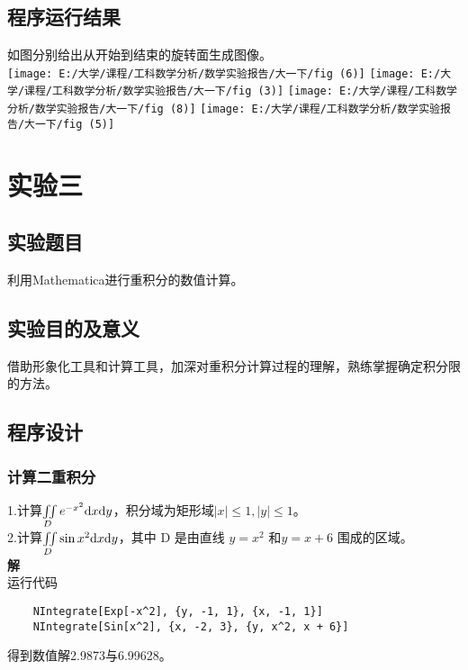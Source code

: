 \documentclass{ctexart}
\begin{document}
\subsection{程序运行结果}
如图分别给出从开始到结束的旋转面生成图像。\\
	\texttt{[image: E:/大学/课程/工科数学分析/数学实验报告/大一下/fig (6)]}
	\texttt{[image: E:/大学/课程/工科数学分析/数学实验报告/大一下/fig (3)]}
	\texttt{[image: E:/大学/课程/工科数学分析/数学实验报告/大一下/fig (8)]}
	\texttt{[image: E:/大学/课程/工科数学分析/数学实验报告/大一下/fig (5)]}


\section{实验三}
\subsection{实验题目}
利用Mathematica进行重积分的数值计算。
\subsection{实验目的及意义}
借助形象化工具和计算工具，加深对重积分计算过程的理解，熟练掌握确定积分限的方法。
\subsection{程序设计}
\subsubsection{计算二重积分}
\noindent1.计算$\iint\limits_{D}e^{-x^2}\mathrm{d} x \mathrm{d} y$，积分域为矩形域$ |x|\leq 1,| y |\leq 1$。\\
2.计算$\iint\limits_{D}\sin x^2\mathrm{d} x \mathrm{d} y$，其中 D 是由直线 $y = x^2$ 和$ y = x + 6$ 围成的区域。\\
\textbf{解}\\
运行代码
\begin{lstlisting}
	NIntegrate[Exp[-x^2], {y, -1, 1}, {x, -1, 1}]
	NIntegrate[Sin[x^2], {x, -2, 3}, {y, x^2, x + 6}]
\end{lstlisting}
得到数值解2.9873与6.99628。
\end{document}
